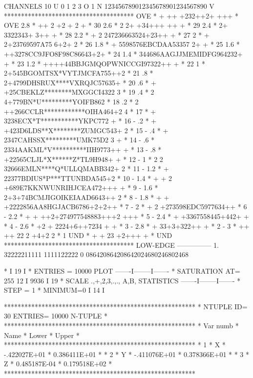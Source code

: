 \begin{Fighere}
\begin{minipage}[t]{.465\textwidth}
\begin{XMPfont}{6}
CHANNELS  10 U 0        1         2         3 O
           1 N 123456789012345678901234567890 V
           **************************************
  OVE      *        + ++ +232++2+ +++           * OVE
    2.8    *      ++ 2    +2 + 2  +             *  30
    2.6    *           2 2+  +34+++ ++   +      *  29
    2.4    *          2+ 3322343+ 3++ +         *  28
    2.2    *    + 2    247236663524+23++   +    *  27
    2      *    +    2+23769597A75 6+2+ 2       *  26
    1.8    *       + 5598576EBCDAA53357  2+ +   *  25
    1.6    *      ++3278CC9JFO8F98C86643+2+     *  24
    1.4    *      344686AAGJJMEMIDFG964232+   + *  23
    1.2    *    ++++44BBJGMQOPWNICCGI97322++  + *  22
    1      *     2+545BGOMTSX*VYTJMCFA755++2    *  21
     .8    *    2+4799DHSRUX****VXRQJC57635+    *  20
     .6    *   + +25CBEKLZ********MXGGCI4322  3 *  19
     .4    * 2   4+779BN*U*********YOIFB862     *  18
     .2    * 2 ++266CCLR************OIHA464+2 4 *  17
           * +  3238ECX*T***********YKPC772   + *  16
-    .2    * + +423D6LDS**X********ZUMGC543+  2 *  15
-    .4    * +  2347CAHSSX*********UMK75D2 3  + *  14
-    .6    *   2334AAKML*V**********IIH9773++ + *  13
-    .8    *   +22565CLJL*X******Z*TL9H948+ +   *  12
-   1      * 2 2 32666EMLN****Q*ULLQMABB342+  2 *  11
-   1.2    *   + 22377BDIUS*P***TTUNBDA545+2    *  10
-   1.4    * + + 2 +689E7KKNWUNRIHJCEA472+++  + *   9
-   1.6    *     2+3+74BCMJIGOIKEIAAD6643++   2 *   8
-   1.8    * + + +2222856AA8HGJACB6786+2+2++    *   7
-   2      *   +   2 +273598EDC5977634++        *   6
-   2.2    * +   + ++2+274977548883+++2 +++     *   5
-   2.4    *         +  +3367558445+442+   +    *   4
-   2.6    *       +2 +  2224+6++7234 +    +    *   3
-   2.8    *          +  33+3+322++ +           *   2
-   3      *       ++ ++ 22 2 +4+2 2            *   1
  UND      *          + +  23 +2+++      +      * UND
           **************************************
LOW-EDGE       ---------------
           1.  32222211111         1111122222
           0   086420864208642024680246802468
 
*                                                   I    19  I
* ENTRIES =    10000            PLOT         -------I--------I-------
* SATURATION  AT=          255                  12  I  9936  I   19
* SCALE  .,+,2,3,.,., A,B,      STATISTICS   -------I--------I-------
* STEP =    1     * MINIMUM=0                       I    14  I
\end{XMPfont}
\end{minipage}
\begin{XMP}
********************************************************
* NTUPLE ID=   30  ENTRIES=  10000   N-TUPLE           *
********************************************************
*  Var numb  *   Name    *    Lower     *    Upper     *
********************************************************
*      1     *    X      * -.422027E+01 * 0.386411E+01 *
*      2     *    Y      * -.411076E+01 * 0.378366E+01 *
*      3     *    Z      * 0.485187E-04 * 0.179518E+02 *
********************************************************
 

\end{XMP}
\end{Fighere}
